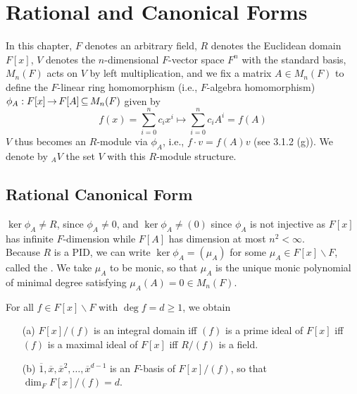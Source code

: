 \documentclass[11pt]{book}
\theoremstyle{definition}   \newtheorem{defn}[counter]{Definition} %
\newcommand{\ov}{\overline}   \newcommand{\wt}{\widetilde}
\newcommand{\bs}{\backslash}   \newcommand{\A}{\mathcal{A}}   \newcommand{\sy}{\textnormal{Syl}}   \newcommand{\size}[1]{\left| #1 \right|}
\DeclareMathOperator{\ra}{\rightarrow}   \DeclareMathOperator{\Poly}{\mathbf{P}}   \DeclareMathOperator{\spn}{\textnormal{span}}   \DeclareMathOperator{\aut}{\textnormal{Aut}}
\newcommand{\vs}{\vspace{8pt}}
\numberwithin{counter}{chapter}
\begin{document}
\chapter{Rational and Canonical Forms}

In this chapter, $F$ denotes an arbitrary field, $R$ denotes the Euclidean domain $F[x]$, $V$ denotes the $n$-dimensional $F$-vector space $F^n$ with the standard basis, $M_n(F)$ acts on $V$ by left multiplication, and we fix a matrix $A \in M_n(F)$ to define the $F$-linear ring homomorphism (i.e., $F$-algebra homomorphism) \\ $\phi_A : F[x] \ra F[A] \sub M_n(F)$ given by
	\[f(x) = \sum_{i=0}^n c_i x^i \mapsto \sum_{i=0}^n c_i A^i = f(A) \]
$V$ thus becomes an $R$-module via $\phi_A$, i.e., $f \cdot v = f(A) v$ (see 3.1.2 (g)). We denote by $_AV$ the set $V$ with this $R$-module structure.

\section{Rational Canonical Form}

\begin{remark}[+ Definition]
$\ker \phi_A \ne R$, since $\phi_A \ne 0$, and $\ker \phi_A \ne (0)$ since $\phi_A$ is not injective as $F[x]$ has infinite $F$-dimension while $F[A]$ has dimension at most $n^2 < \infty$. \\

Because $R$ is a PID, we can write $\ker \phi_A = (\mu_A)$ for some $\mu_A \in F[x]\bs F$, called the . We take $\mu_A$ to be monic, so that $\mu_A$ is the unique monic polynomial of minimal degree satisfying $\mu_A(A) = 0 \in M_n(F)$.
\end{remark}

\vs

\begin{lemma}
For all $f \in F[x]\bs F$ with $\deg f = d \geq 1$, we obtain
\begin{enumerate}
\item[(a)] $F[x]/(f)$ is an integral domain iff $(f)$ is a prime ideal of $F[x]$ iff $(f)$ is a maximal ideal of $F[x]$ iff $R/(f)$ is a field.
\item[(b)] $\ov{1}, \ov{x}, \ov{x}^2,\dots,\ov{x}^{d-1}$ is an $F$-basis of $F[x]/(f)$, so that $\dim_F F[x]/(f) = d$.
\end{enumerate}
\end{lemma}
\end{document}
